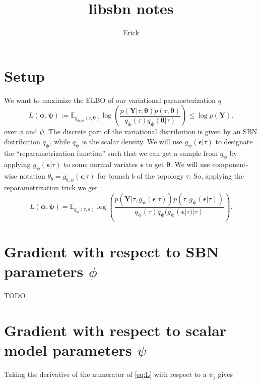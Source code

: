 \documentclass{article}
\title{libsbn notes}
\author{Erick}
\begin{document}


\section*{Setup}
We want to maximize the ELBO of our variational parameterization $q$
\[
L(\bm{\phi},{\bm{\psi}}) := \mathbb{E}_{q_{\bm{\phi},{\bm{\psi}}}(\tau, \bm{\theta})}\log\left(\frac{p(\bm{Y}|\tau, \bm{\theta}) p(\tau, \bm{\theta})}{q_{\bm{\phi}}(\tau)q_{\bm{\psi}}(\bm{\theta}|\tau)}\right) \leq \log p(\bm{Y}).
\]
over $\phi$ and $\psi$.
The discrete part of the variational distribution is given by an SBN distribution $q_{\bm\phi}$, while $q_{\bm\psi}$ is the scalar density.
We will use $g_{\bm{\psi}}(\bm{\epsilon}|\tau)$ to designate the ``reparametrization function'' such that we can get a sample from $q_{\bm\psi}$ by applying $g_{\bm{\psi}}(\bm{\epsilon}|\tau)$ to some normal variates $\bm\epsilon$ to get $\bm\theta$.
We will use component-wise notation $\theta_b = g_{b, \psi}(\bm\epsilon|\tau)$ for branch $b$ of the topology $\tau$.
So, applying the reparametrization trick we get
\begin{equation}
L(\bm{\phi},{\bm{\psi}}) = \mathbb{E}_{
    q_{\bm{\phi}}(\tau,\bm{\epsilon})}
    \log\left(
        \frac
        {p(\bm{Y}|\tau,g_{\bm{\psi}}(\bm{\epsilon}|\tau))p(\tau, g_{\bm{\psi}}(\bm{\epsilon}|\tau))}
        {q_{\bm{\phi}}(\tau)q_{\bm{\psi}}(g_{\bm{\psi}}(\bm{\epsilon}|\tau)|\tau)}
    \right).
\label{eq:L}
\end{equation}

\section*{Gradient with respect to SBN parameters $\phi$}

TODO

\section*{Gradient with respect to scalar model parameters $\psi$}

Taking the derivative of the numerator of \eqref{eq:L} with respect to a $\psi_i$ gives
\end{document}
